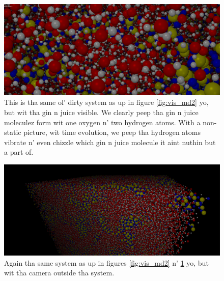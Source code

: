 \begin{figure}[htb]
\begin{center}
\includegraphics[width=\textwidth, trim=0cm 0cm 0cm 0cm, clip]{visualization/figures/md2.png}
\end{center}
\caption{This is tha same ol' dirty system as up in figure \ref{fig:vis_md2} yo, but wit tha gin n juice visible. We clearly peep tha gin n juice moleculez form wit one oxygen n' two hydrogen atoms. With a non-static picture, wit time evolution, we peep tha hydrogen atoms vibrate n' even chizzle which gin n juice molecule it aint nuthin but a part of. }
\label{fig:vis_md3}
\end{figure}

\begin{figure}[htb]
\begin{center}
\includegraphics[width=\textwidth, trim=0cm 0cm 0cm 0cm, clip]{visualization/figures/md3.png}
\end{center}
\caption{Again tha same system as up in figures \ref{fig:vis_md2} n' \ref{fig:vis_md3} yo, but wit tha camera outside tha system. }
\label{fig:vis_md4}
\end{figure}